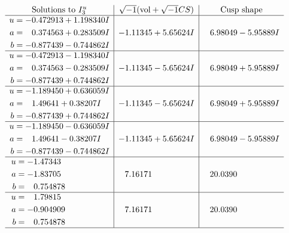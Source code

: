 \documentclass[1p]{elsarticle_modified}
\theoremstyle{definition}
\newcommand{\I}{\sqrt{-1}}
\begin{document}
$$\begin{array}{c|c|c}  
\text{Solutions to }I^u_{3}& \I (\text{vol} + \sqrt{-1}CS) & \text{Cusp shape}\\
 \hline 
\begin{aligned}
u &= -0.472913 + 1.198340 I \\
a &= \phantom{-}0.374563 + 0.283509 I \\
b &= -0.877439 - 0.744862 I\end{aligned}
 & -1.11345 + 5.65624 I & \phantom{-}6.98049 - 5.95889 I \\ \hline\begin{aligned}
u &= -0.472913 - 1.198340 I \\
a &= \phantom{-}0.374563 - 0.283509 I \\
b &= -0.877439 + 0.744862 I\end{aligned}
 & -1.11345 - 5.65624 I & \phantom{-}6.98049 + 5.95889 I \\ \hline\begin{aligned}
u &= -1.189450 + 0.636059 I \\
a &= \phantom{-}1.49641 + 0.38207 I \\
b &= -0.877439 + 0.744862 I\end{aligned}
 & -1.11345 - 5.65624 I & \phantom{-}6.98049 + 5.95889 I \\ \hline\begin{aligned}
u &= -1.189450 - 0.636059 I \\
a &= \phantom{-}1.49641 - 0.38207 I \\
b &= -0.877439 - 0.744862 I\end{aligned}
 & -1.11345 + 5.65624 I & \phantom{-}6.98049 - 5.95889 I \\ \hline\begin{aligned}
u &= -1.47343\phantom{ +0.000000I} \\
a &= -1.83705\phantom{ +0.000000I} \\
b &= \phantom{-}0.754878\phantom{ +0.000000I}\end{aligned}
 & \phantom{-}7.16171\phantom{ +0.000000I} & \phantom{-}20.0390\phantom{ +0.000000I} \\ \hline\begin{aligned}
u &= \phantom{-}1.79815\phantom{ +0.000000I} \\
a &= -0.904909\phantom{ +0.000000I} \\
b &= \phantom{-}0.754878\phantom{ +0.000000I}\end{aligned}
 & \phantom{-}7.16171\phantom{ +0.000000I} & \phantom{-}20.0390\phantom{ +0.000000I}\\
 \hline 
 \end{array}$$\newpage\newpage\renewcommand{\arraystretch}{1}
\end{document}
